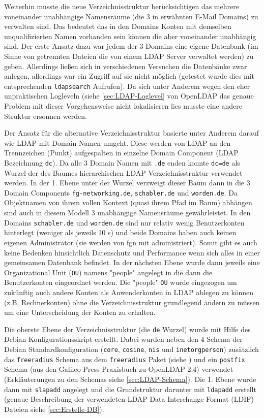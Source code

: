 \documentclass[11pt,a4paper,titlepage=firstiscover]{scrartcl} %
\begin{document}
Weiterhin musste die neue Verzeichnisstruktur berücksichtigen das mehrere voneinander unabhängige Namensräume (die 3 in  erwähnten E-Mail Domains) zu verwalten sind. Das bedeutet das in den Domains Konten mit demselben unqualifizierten Namen vorhanden sein können die aber voneinander unabhängig sind. Der erste Ansatz dazu war jedem der 3 Domains eine eigene Datenbank (im Sinne von getrennten Dateien die von einem LDAP Server verwaltet werden) zu geben. Allerdings ließen sich in verschiedenen Versuchen die Datenbänke zwar anlegen, allerdings war ein Zugriff auf sie nicht möglich (getestet wurde dies mit entsprechenden \texttt{ldapsearch} Aufrufen). Da sich unter Anderem wegen den eher unpraktischen Logleveln (siehe \autoref{sec:LDAP-Loglevel} von OpenLDAP das genaue Problem mit dieser Vorgehensweise nicht lokalisieren lies musste eine andere Struktur ersonnen werden.

Der Ansatz für die alternative Verzeichnisstruktur basierte unter Anderem darauf wie LDAP mit Domain Namen umgeht. Diese werden von LDAP an den Trennzeichen (Punkt) aufgespalten in einzelne Domain Component (LDAP Bezeichnung \texttt{dc}). Da alle 3 Domain Namen mit \texttt{.de} enden konnte \texttt{dc=de} als Wurzel der des Baumes hierarchischen LDAP Verzeichnisstruktur verwendet werden. In der 1. Ebene unter der Wurzel verzweigt dieser Baum dann in die 3 Domain Components  \texttt{fg-networking.de}, \texttt{schabler.de} und \texttt{worden.de}. Da Objektnamen von ihrem vollen Kontext (quasi ihrem Pfad im Baum) abhängen sind auch in diesem Modell 3 unabhängige Namensräume gewährleistet. In den Domains \texttt{schabler.de} und \texttt{worden.de} sind nur relativ wenig Benutzerkonten hinterlegt (weniger als jeweils 10 s) und beide Domains haben auch keinen eigenen Administrator (sie werden von fgn mit administriert). Somit gibt es auch keine Bedenken hinsichtlich Datenschutz und Performance wenn sich alles in einer gemeinsamen Datenbank befindet. In der nächsten Ebene wurde dann jeweils eine Organizational Unit (\texttt{OU}) namens "people" angelegt in die dann die Benutzerkonten eingeordnet werden. Die "people" \texttt{OU} wurde eingezogen um zukünftig auch andere Konten als Anwenderkonten in LDAP ablegen zu können (z.B. Rechnerkonten) ohne die Verzeichnisstruktur grundlegend ändern zu müssen um eine Unterscheidung der Konten zu erhalten.

Die oberste Ebene der Verzeichnisstruktur (die \texttt{de} Wurzel) wurde mit Hilfe des Debian Konfigurationsskript erstellt. Dabei wurden neben den 4 Schema der Debian Standardkonfiguration (\texttt{core}, \texttt{cosine}, \texttt{nis} und \texttt{inetorgperson}) zusätzlich das \texttt{freeradius} Schema aus dem \texttt{freeradius} Paket (siehe ) und ein \texttt{postfix} Schema (aus den Galileo Press Praxisbuch zu OpenLDAP 2.4) verwendet (Erkläuterungen zu den Schemas siehe \autoref{sec:LDAP-Schema}). Die 1. Ebene wurde dann mit \texttt{slapadd} angelegt und die Grundstruktur darunter mit \texttt{ldapadd} erstellt (genaue Beschreibung der verwendeten LDAP Data Interchange Format (LDIF) Dateien siehe \autoref{sec:Erstelle-DB}).
\end{document}
